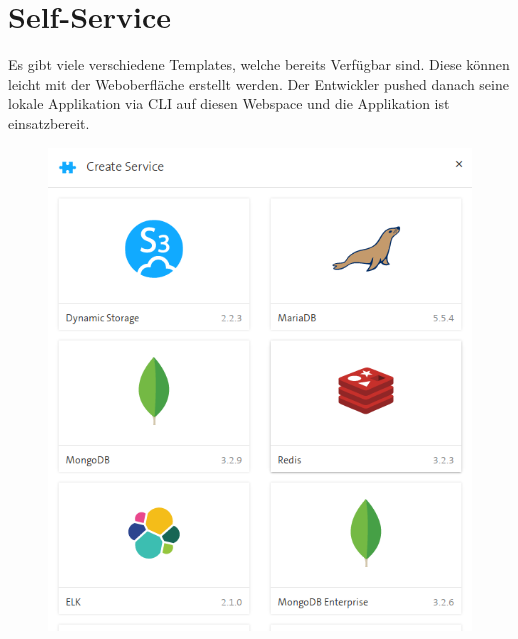 \section{Self-Service}
Es gibt viele verschiedene Templates, welche bereits Verfügbar sind. Diese können leicht mit der Weboberfläche erstellt werden. Der Entwickler pushed danach seine lokale Applikation via CLI auf diesen Webspace und die Applikation ist einsatzbereit.
\begin{figure}[H]
\centering
\includegraphics[scale=0.65{images/image01.png} 
\includegraphics[scale=0.3]{images/image08.png} 
\end{figure}

